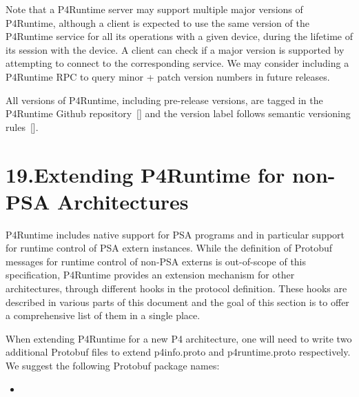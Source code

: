 \documentclass[11pt]{article}
\begin{document}
{%
Note that a P4Runtime server may support multiple major versions of P4Runtime,
although a client is expected to use the same version of the P4Runtime service
for all its operations with a given device, during the lifetime of its session
with the device. A client can check if a major version is supported by
attempting to connect to the corresponding service. We may consider including a
P4Runtime RPC to query minor + patch version numbers in future releases.%

All versions of P4Runtime, including pre-release versions, are tagged in the
P4Runtime Github repository~[] and the version label follows
semantic versioning rules~[].%

\section{19.\hspace*{0.5em}Extending P4Runtime for non-PSA Architectures}\label{sec-extending-p4runtime}%

\noindent{}P4Runtime includes native support for PSA programs and in particular support for
runtime control of PSA extern instances. While the definition of Protobuf
messages for runtime control of non-PSA externs is out-of-scope of this
specification, P4Runtime provides an extension mechanism for other
architectures, through different hooks in the protocol definition. These hooks
are described in various parts of this document and the goal of this section is
to offer a comprehensive list of them in a single place.%

When extending P4Runtime for a new P4 architecture, one will need to write two
additional Protobuf files to extend p4info.proto and p4runtime.proto
respectively. We suggest the following Protobuf package names:%

\begin{itemize}[noitemsep,topsep=\mdcompacttopsep]%

\item{}%


\end{itemize}}
\end{document}
